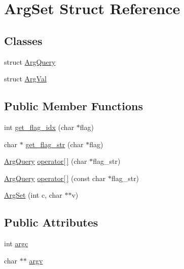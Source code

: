 \hypertarget{structArgSet}{\section{Arg\-Set Struct Reference}
\label{structArgSet}
}
\subsection*{Classes}
\begin{DoxyCompactItemize}
\item 
struct \hyperlink{structArgSet_1_1ArgQuery}{Arg\-Query}
\item 
struct \hyperlink{structArgSet_1_1ArgVal}{Arg\-Val}
\end{DoxyCompactItemize}
\subsection*{Public Member Functions}
\begin{DoxyCompactItemize}
\item 
int \hyperlink{structArgSet_aff055012f8a22cd6294fc4aab1c4d0dd}{get\-\_\-flag\-\_\-idx} (char $\ast$flag)
\item 
char $\ast$ \hyperlink{structArgSet_ab2fe549a33cd8d4261100960f052bdeb}{get\-\_\-flag\-\_\-str} (char $\ast$flag)
\item 
\hyperlink{structArgSet_1_1ArgQuery}{Arg\-Query} \hyperlink{structArgSet_ae175e624b75ec7b774078243e8c49dcc}{operator\mbox{[}$\,$\mbox{]}} (char $\ast$flag\-\_\-str)
\item 
\hyperlink{structArgSet_1_1ArgQuery}{Arg\-Query} \hyperlink{structArgSet_ad516f054276d8577a327cbf2c2b8db1a}{operator\mbox{[}$\,$\mbox{]}} (const char $\ast$flag\-\_\-str)
\item 
\hyperlink{structArgSet_ababf0dbf547524e15a64996177924785}{Arg\-Set} (int c, char $\ast$$\ast$v)
\end{DoxyCompactItemize}
\subsection*{Public Attributes}
\begin{DoxyCompactItemize}
\item 
int \hyperlink{structArgSet_aa689d52ab489a875619dc9b4d6ff8188}{argc}
\item 
char $\ast$$\ast$ \hyperlink{structArgSet_af888700f222cf72a0b0529ffa1649025}{argv}
\end{DoxyCompactItemize}



